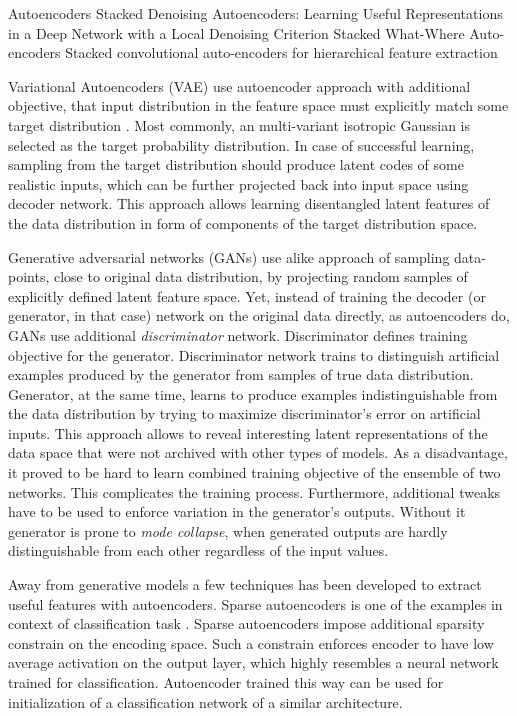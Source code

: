 Autoencoders
Stacked Denoising Autoencoders: Learning Useful Representations in a Deep Network with a Local Denoising Criterion \cite{Vincent2010}
Stacked What-Where Auto-encoders \cite{Zhao2015}
Stacked convolutional auto-encoders for hierarchical feature extraction \cite{Masci2011}


Variational Autoencoders (VAE) use autoencoder approach with additional objective, that input distribution in the feature space must explicitly match some target distribution \cite{Kingma2013, Doersch2016}.
Most commonly, an multi-variant isotropic Gaussian is selected as the target probability distribution.
In case of successful learning, sampling from the target distribution should produce latent codes of some realistic inputs, which can be further projected back into input space using decoder network.
This approach allows learning disentangled latent features of the data distribution in form of components of the target distribution space.

Generative adversarial networks (GANs) \cite{Goodfellow2014} use alike approach of sampling data-points, close to original data distribution, by projecting random samples of explicitly defined latent feature space.
Yet, instead of training the decoder (or generator, in that case) network on the original data directly, as autoencoders do, GANs use additional \textit{discriminator} network. Discriminator defines training objective for the generator. Discriminator network trains to distinguish artificial examples produced by the generator from samples of true data distribution.
Generator, at the same time, learns to produce examples indistinguishable from the data distribution by trying to maximize discriminator's error on artificial inputs.
This approach allows to reveal interesting latent representations of the data space that were not archived with other types of models.
As a disadvantage, it proved to be hard to learn combined training objective of the ensemble of two networks.
This complicates the training process.
Furthermore, additional tweaks have to be used to enforce variation in the generator's outputs.
Without it generator is prone to \textit{mode collapse}, when generated outputs are hardly distinguishable from each other regardless of the input values.

Away from generative models a few techniques has been developed to extract useful features with autoencoders.
Sparse autoencoders is one of the examples in context of classification task \cite{Ng2011, Makhzani2013, Masci2011}. Sparse autoencoders impose additional sparsity constrain on the encoding space.
Such a constrain enforces encoder to have low average activation on the output layer, which highly resembles a neural network trained for classification.
Autoencoder trained this way can be used for initialization of a classification network of a similar architecture.

